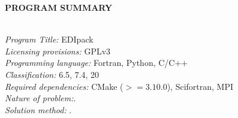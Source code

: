 \documentclass[preprint,3p,10pt]{elsarticle}
\begin{document}
\noindent
{\bf PROGRAM SUMMARY}
\begin{small}
  \noindent
  \\
  {\em Program Title:}  EDIpack                                        \\
  {\em Licensing provisions:} GPLv3\\
  {\em Programming language:}  Fortran, Python, C/C++\\
  {\em Classification:} 6.5, 7.4, 20 \\
  {\em Required dependencies:} CMake ($>=3.10.0$), Scifortran, MPI\\
  {\em Nature of problem:}. \\
  {\em Solution method:} .\\
\end{small}


\tableofcontents




















\end{document}
